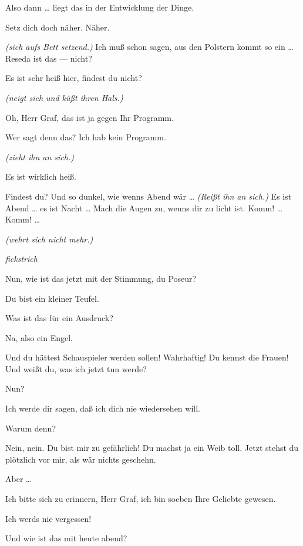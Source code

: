\documentclass[
	final,
	a4paper,
	ngerman,
	mpinclude = true, %
	twoside = true,
	open = right,
	cleardoublepage = plain,
	DIV = 13,
	BCOR = 1cm,
	titlepage = firstiscover,
	]{scrbook}
\newcommand{\direction}[1]{\textit{(#1)}}
\newcommand{\hiat}{%
	\begin{center}
		\tiny
		\raisebox{0.5ex}{\rule{0.3\linewidth}{0.4pt}}
		\textit{fickstrich}
		\raisebox{0.5ex}{\rule{0.3\linewidth}{0.4pt}}
	\end{center}
}
\newcommand{\thecharacter}[1]{\textup{\textsc{#1}}\xspace}
\newcommand{\theschauspielerin}{\thecharacter{Schauspielerin}}
\newcommand{\thegraf}{\thecharacter{Graf}}
\newcommand{\character}[1]{\item[#1:]}
\newcommand{\schauspielerin}{\character{\theschauspielerin}}
\newcommand{\graf}{\character{\thegraf}}
\begin{document}
\begin{play}
	\graf
	Also dann \ldots{} liegt das in der Entwicklung der Dinge.

	\schauspielerin
	Setz dich doch näher. Näher.

	\graf
	\direction{sich aufs Bett setzend.} Ich muß schon sagen, aus den Polstern kommt so ein \ldots{} Reseda ist das --- nicht?

	\schauspielerin
	Es ist sehr heiß hier, findest du nicht?

	\graf
	\direction{neigt sich und küßt ihren Hals.}

	\schauspielerin
	Oh, Herr Graf, das ist ja gegen Ihr Programm.

	\graf
	Wer sagt denn das? Ich hab kein Programm.

	\schauspielerin
	\direction{zieht ihn an sich.}

	\graf
	Es ist wirklich heiß.

	\schauspielerin
	Findest du? Und so dunkel, wie wenns Abend wär \ldots{} \direction{Reißt ihn an sich.} Es ist Abend \ldots{} es ist Nacht \ldots{} Mach die Augen zu, wenns dir zu licht ist. Komm! \ldots{} Komm! \ldots{}

	\graf
	\direction{wehrt sich nicht mehr.}

	\hiat

	\schauspielerin
	Nun, wie ist das jetzt mit der Stimmung, du Poseur?

	\graf
	Du bist ein kleiner Teufel.

	\schauspielerin
	Was ist das für ein Ausdruck?

	\graf
	Na, also ein Engel.

	\schauspielerin
	Und du hättest Schauspieler werden sollen! Wahrhaftig! Du kennst die Frauen! Und weißt du, was ich jetzt tun werde?

	\graf
	Nun?

	\schauspielerin
	Ich werde dir sagen, daß ich dich nie wiedersehen will.

	\graf
	Warum denn?

	\schauspielerin
	Nein, nein. Du bist mir zu gefährlich! Du machst ja ein Weib toll. Jetzt stehst du plötzlich vor mir, als wär nichts geschehn.

	\graf
	Aber \ldots{}

	\schauspielerin
	Ich bitte sich zu erinnern, Herr Graf, ich bin soeben Ihre Geliebte gewesen.

	\graf
	Ich werds nie vergessen!

	\schauspielerin
	Und wie ist das mit heute abend?


\end{play}
\end{document}
